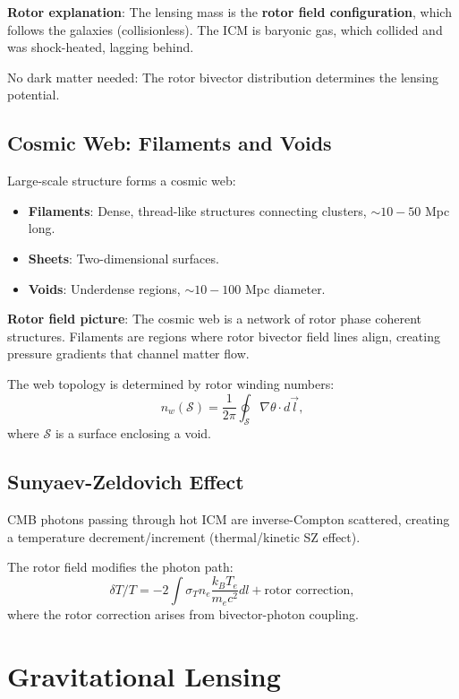 \documentclass[12pt,a4paper]{article}
\theoremstyle{definition}
\theoremstyle{remark}
\begin{document}
\textbf{Rotor explanation}: The lensing mass is the \textbf{rotor field configuration}, which follows the galaxies (collisionless). The ICM is baryonic gas, which collided and was shock-heated, lagging behind.

No dark matter needed: The rotor bivector distribution determines the lensing potential.

\subsection{Cosmic Web: Filaments and Voids}

Large-scale structure forms a cosmic web:
\begin{itemize}
\item \textbf{Filaments}: Dense, thread-like structures connecting clusters, $\sim 10-50$ Mpc long.
\item \textbf{Sheets}: Two-dimensional surfaces.
\item \textbf{Voids}: Underdense regions, $\sim 10-100$ Mpc diameter.
\end{itemize}

\textbf{Rotor field picture}: The cosmic web is a network of rotor phase coherent structures. Filaments are regions where rotor bivector field lines align, creating pressure gradients that channel matter flow.

The web topology is determined by rotor winding numbers:
\begin{equation}
n_w(\mathcal{S}) = \frac{1}{2\pi} \oint_{\mathcal{S}} \nabla \theta \cdot d\vec{l},
\end{equation}
where $\mathcal{S}$ is a surface enclosing a void.

\subsection{Sunyaev-Zeldovich Effect}

CMB photons passing through hot ICM are inverse-Compton scattered, creating a temperature decrement/increment (thermal/kinetic SZ effect).

The rotor field modifies the photon path:
\begin{equation}
\delta T / T = -2 \int \sigma_T n_e \frac{k_B T_e}{m_e c^2} dl + \text{rotor correction},
\end{equation}
where the rotor correction arises from bivector-photon coupling.

\section{Gravitational Lensing}
\end{document}
